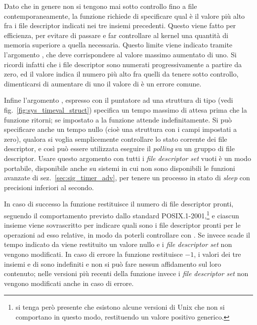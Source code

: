 Dato che in genere non si tengono mai sotto controllo fino a
 file contemporaneamente, la funzione richiede di
specificare qual è il valore più alto fra i file descriptor indicati nei tre
insiemi precedenti. Questo viene fatto per efficienza, per evitare di passare
e far controllare al kernel una quantità di memoria superiore a quella
necessaria. Questo limite viene indicato tramite l'argomento , che
deve corrispondere al valore massimo aumentato di uno. Si ricordi infatti che
i file descriptor sono numerati progressivamente a partire da zero, ed il
valore indica il numero più alto fra quelli da tenere sotto controllo,
dimenticarsi di aumentare di uno il valore di  è un errore comune.

Infine l'argomento , espresso con il puntatore ad una struttura
di tipo  (vedi fig.~\ref{fig:sys_timeval_struct}) specifica un
tempo massimo di attesa prima che la funzione ritorni; se impostato a
 la funzione attende indefinitamente. Si può specificare anche un
tempo nullo (cioè una struttura  con i campi impostati a
zero), qualora si voglia semplicemente controllare lo stato corrente dei file
descriptor, e così può essere utilizzata eseguire il \textit{polling} su un
gruppo di file descriptor. Usare questo argomento con tutti i \textit{file
  descriptor set} vuoti è un modo portabile, disponibile anche su sistemi in
cui non sono disponibili le funzioni avanzate di sez.~\ref{sec:sig_timer_adv},
per tenere un processo in stato di \textit{sleep} con precisioni inferiori al
secondo.

In caso di successo la funzione restituisce il numero di file descriptor
pronti, seguendo il comportamento previsto dallo standard
POSIX.1-2001,\footnote{si tenga però presente che esistono alcune versioni di
  Unix che non si comportano in questo modo, restituendo un valore positivo
  generico.}  e ciascun insieme viene sovrascritto per indicare quali sono i
file descriptor pronti per le operazioni ad esso relative, in modo da poterli
controllare con .  Se invece scade il tempo indicato
da  viene restituito un valore nullo e i \textit{file descriptor
  set} non vengono modificati. In caso di errore la funzione restituisce $-1$, i
valori dei tre insiemi e di  sono indefiniti e non si può fare
nessun affidamento sul loro contenuto; nelle versioni più recenti della
funzione invece i \textit{file descriptor set} non vengono modificati anche in
caso di errore.

